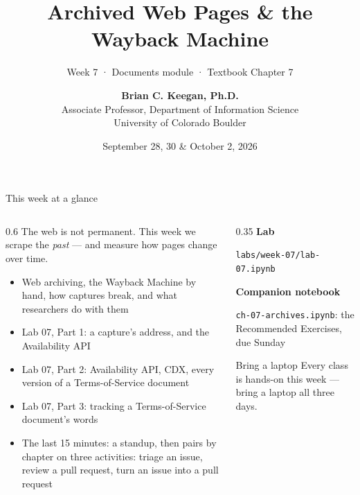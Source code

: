 \documentclass[9pt,aspectratio=169]{beamer}
\title[Week 7 · Web Archives]{{\Huge Archived Web Pages \& the Wayback Machine}}
\subtitle{Week 7 · Documents module · Textbook Chapter 7}
\author[Keegan]{\textbf{Brian C. Keegan, Ph.D.} \\ Associate Professor, Department of Information Science \\ University of Colorado Boulder}
\date{September 28, 30 \& October 2, 2026}
\begin{document}
\maketitle

\begin{frame}{This week at a glance}
    \begin{columns}
        \begin{column}{0.6\textwidth}
            The web is not permanent. This week we scrape the \textit{past} --- and measure how pages change over time.

            \bigskip

            \begin{itemize}\small
                \item Web archiving, the Wayback Machine by hand, how captures break, and what researchers do with them
                \item Lab 07, Part 1: a capture's address, and the Availability API
            \end{itemize}

            \medskip

            \begin{itemize}\small
                \item Lab 07, Part 2: Availability API, CDX, every version of a Terms-of-Service document
            \end{itemize}

            \medskip

            \begin{itemize}\small
                \item Lab 07, Part 3: tracking a Terms-of-Service document's words
                \item The last 15 minutes: a standup, then pairs by chapter on three activities: triage an issue, review a pull request, turn an issue into a pull request
            \end{itemize}
        \end{column}
        \begin{column}{0.35\textwidth}
            \textbf{Lab}\\[2pt]
            {\footnotesize \texttt{labs/week-07/lab-07.ipynb}\par}
            \medskip
            \textbf{Companion notebook}\\[2pt]
            {\footnotesize \texttt{ch-07-archives.ipynb}: the Recommended Exercises, due Sunday\par}
            \medskip
            \begin{alertblock}{Bring a laptop}
                \footnotesize Every class is hands-on this week --- bring a laptop all three days.
            \end{alertblock}
        \end{column}
    \end{columns}
\end{frame}
\end{document}
